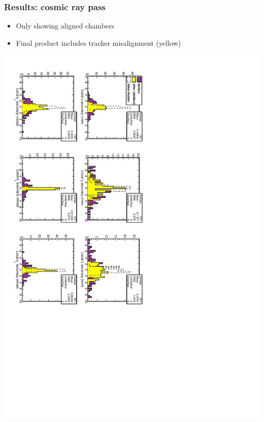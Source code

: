 \documentclass[compress]{beamer}
\begin{document}
\begin{frame}
\frametitle{Results: cosmic ray pass}

\begin{itemize}
\item Only showing aligned chambers
\item Final product includes tracker misalignment (yellow)
\end{itemize}

\includegraphics[height=\linewidth, angle=90]{scenario_cosmics.pdf}
\end{frame}
\end{document}

